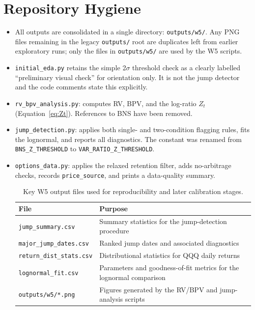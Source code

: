 \documentclass[11pt,a4paper]{article}
\begin{document}
\section{Repository Hygiene}

\begin{itemize}
  \item All outputs are consolidated in a single directory: \texttt{outputs/w5/}. Any PNG files remaining in the legacy \texttt{outputs/} root are duplicates left from earlier exploratory runs; only the files in \texttt{outputs/w5/} are used by the W5 scripts.
  \item \texttt{initial\_eda.py} retains the simple 2$\sigma$ threshold check as a clearly labelled ``preliminary visual check'' for orientation only. It is not the jump detector and the code comments state this explicitly.
  \item \texttt{rv\_bpv\_analysis.py}: computes RV, BPV, and the log-ratio $Z_t$ (Equation~\eqref{eq:Zt}). References to BNS have been removed.
  \item \texttt{jump\_detection.py}: applies both single- and two-condition flagging rules, fits the lognormal, and reports all diagnostics. The constant was renamed from \texttt{BNS\_Z\_THRESHOLD} to \texttt{VAR\_RATIO\_Z\_THRESHOLD}.
  \item \texttt{options\_data.py}: applies the relaxed retention filter, adds no-arbitrage checks, records \texttt{price\_source}, and prints a data-quality summary.

  \begin{table}[htbp]
    \centering
    \small
    \caption{Key W5 output files used for reproducibility and later calibration stages.}
    \label{tab:w5-output-files}
    \begin{tabular}{p{4.3cm}p{7.2cm}}
        \toprule
        File & Purpose \\
        \midrule
        \texttt{jump\_summary.csv} & Summary statistics for the jump-detection procedure \\
        \texttt{major\_jump\_dates.csv} & Ranked jump dates and associated diagnostics \\
        \texttt{return\_dist\_stats.csv} & Distributional statistics for QQQ daily returns \\
        \texttt{lognormal\_fit.csv} & Parameters and goodness-of-fit metrics for the lognormal comparison \\
        \texttt{outputs/w5/*.png} & Figures generated by the RV/BPV and jump-analysis scripts \\
        \bottomrule
    \end{tabular}
\end{table}

  
\end{itemize}
\end{document}
